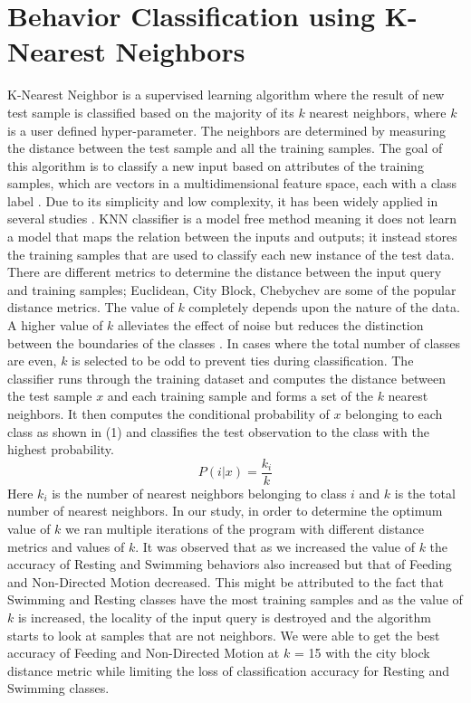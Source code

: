 \documentclass[conference]{IEEEtran}
\begin{document}
\section{Behavior Classification using K-Nearest Neighbors}
K-Nearest Neighbor is a supervised learning algorithm where the result of new test sample is classified based on the majority of its $k$ nearest neighbors, where $k$ is a user defined hyper-parameter. The neighbors are determined by measuring the distance between the test sample and all the training samples. The goal of this algorithm is to classify a new input based on attributes of the training samples, which are vectors in a multidimensional feature space, each with a class label \cite{rosati}. Due to its simplicity and low complexity, it has been widely applied in several studies \cite{jan1, rosati, jan2}. KNN classifier is a model free method meaning it does not learn a model that maps the relation between the inputs and outputs; it instead stores the training samples that are used to classify each new instance of the test data\cite{zhang}. There are different metrics to determine the distance between the input query and training samples; Euclidean, City Block, Chebychev are some of the popular distance metrics. The value of $k$ completely depends upon the nature of the data. A higher value of $k$ alleviates the effect of noise but reduces the distinction between the boundaries of the classes \cite{rosati}. In cases where the total number of classes are even, $k$ is selected to be odd to prevent ties during classification. 
The classifier runs through the training dataset and computes the distance between the test sample $x$ and each training sample and forms a set of the $k$ nearest neighbors. It then computes the conditional probability of $x$ belonging to each class as shown in (1) and classifies the test observation to the class with the highest probability.
\begin{equation}
P(i|x) = \frac{k_i}{k}
\end{equation}
Here $k_i$ is the number of nearest neighbors belonging to class $i$ and $k$ is the total number of nearest neighbors. In our study, in order to determine the optimum value of $k$ we ran multiple iterations of the program with different distance metrics and values of $k$. It was observed that as we increased the value of $k$ the accuracy of Resting and Swimming behaviors also increased but that of Feeding and Non-Directed Motion decreased. This might be attributed to the fact that Swimming and Resting classes have the most training samples and as the value of $k$ is increased, the locality of the input query is destroyed and the algorithm starts to look at samples that are not neighbors.  We were able to get the best accuracy of Feeding and Non-Directed Motion at $k$ = 15 with the city block distance metric while limiting the loss of classification  accuracy for Resting and Swimming classes.
\end{document}
